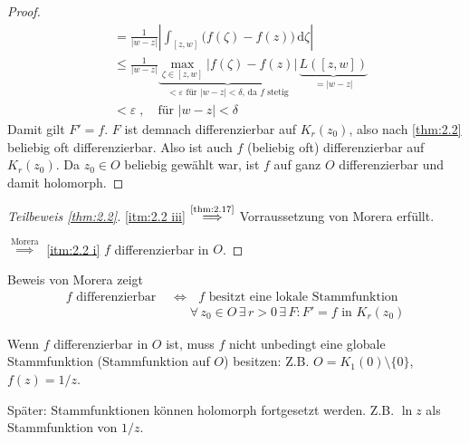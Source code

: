 \documentclass[a4paper,10pt]{scrbook}
\begin{document}
\begin{theorem}
\begin{proof}
    \begin{align*}
      &= \frac{1}{|w - z|} \left| \int_{[z,w]} \Big( f(\zeta) - f(z) \Big) \, \mathrm{d}\zeta \right| \\
      &\leq \frac{1}{|w - z|} \underbrace{\max\limits_{\zeta \in [z,w]} \Big|f(\zeta) - f(z)\Big|}_{< \varepsilon \text{ für } |w-z| < \delta \text{, da $f$ stetig}} \, \underbrace{L([z,w])}_{=|w-z|} \\
      &< \varepsilon \; , \quad \text{für } |w-z| < \delta
    \end{align*}
    Damit gilt $F' = f$.
    $F$ ist demnach differenzierbar auf $K_r(z_0)$, also nach \ref{thm:2.2} beliebig oft differenzierbar.
    Also ist auch $f$ (beliebig oft) differenzierbar auf $K_r(z_0)$.
    Da $z_0\in O$ beliebig gewählt war, ist $f$ auf ganz $O$ differenzierbar und damit holomorph.
  \end{proof}
\end{theorem}


\begin{proof}[Teilbeweis \ref{thm:2.2}]
  \ref{itm:2.2 iii} $\overset{\text{\ref{thm:2.17}}}{\implies}$ Vorraussetzung von Morera erfüllt.

  $\overset{\text{Morera}}{\implies}$ \ref{itm:2.2 i} $f$ differenzierbar in $O$.
\end{proof}

\begin{notice}
  \begin{enum-arab}
    \item Beweis von Morera zeigt
    \begin{align*}
      \text{$f$ differenzierbar } &\iff \text{ $f$ besitzt eine lokale Stammfunktion} \\
      &\phantom{\iff} \forall \, z_0 \in O \, \exists \, r > 0 \, \exists \, F : F' = f \text{ in } K_r(z_0)
    \end{align*}

    \item Wenn $f$ differenzierbar in $O$ ist, muss $f$ nicht unbedingt eine globale Stammfunktion (Stammfunktion auf $O$) besitzen: Z.B. $O = K_1(0) \setminus \{0\}$, $f(z) = 1/z$.

    Später: Stammfunktionen können holomorph fortgesetzt werden. Z.B. $\ln z$ als Stammfunktion von $1/z$.
  \end{enum-arab}
\end{notice}
\end{document}
